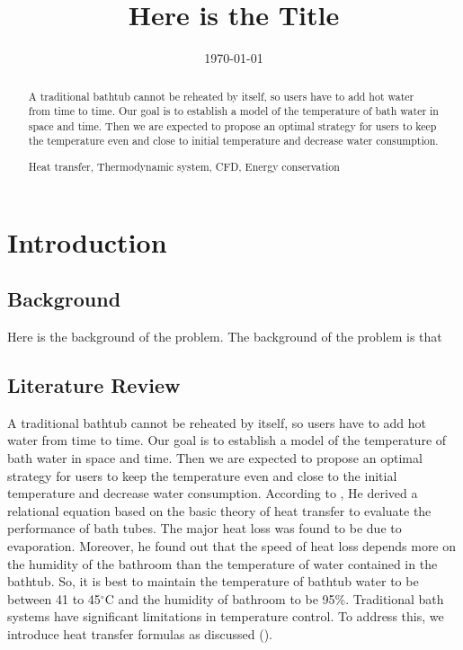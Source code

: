 \documentclass{mcmthesis}
\title{Here is the Title}
\date{\today}
\renewcommand{\contentsname}{\hspace*{\fill}\Large\bfseries Contents \hspace*{\fill}}
\begin{document}
\begin{abstract}

    A traditional bathtub cannot be reheated by itself, so users have to add hot
    water from time to time. Our goal is to establish a model of the temperature
    of bath water in space and time. Then we are expected to propose an optimal
    strategy for users to keep the temperature even and close to initial temperature
    and decrease water consumption.

    

    \begin{keywords}
        Heat transfer, Thermodynamic system, CFD, Energy conservation
    \end{keywords}

\end{abstract}

\maketitle

\tableofcontents        %
\thispagestyle{empty}

\newpage

\section{Introduction}

\subsection{Background}

Here is the background of the problem. The background of the problem is that

\subsection{Literature Review}

A traditional bathtub cannot be reheated by itself, so users have to add hot
water from time to time. Our goal is to establish a model of the temperature
of bath water in space and time. Then we are expected to propose an optimal
strategy for users to keep the temperature even and close to the initial
temperature and decrease water consumption. According to \textcite{kim2006},
He derived a relational equation based on the basic theory of heat transfer
to evaluate the performance of bath tubes. The major heat loss was found to be
due to evaporation. Moreover, he found out that the speed of heat loss depends
more on the humidity of the bathroom than the temperature of water contained
in the bathtub. So, it is best to maintain the temperature of bathtub water to
be between 41 to 45$^{\circ}$C and the humidity of bathroom to be 95\%.
Traditional bath systems have significant limitations in temperature control.
To address this, we introduce heat transfer formulas as
discussed (\cite[123]{holman2002}).
\end{document}

